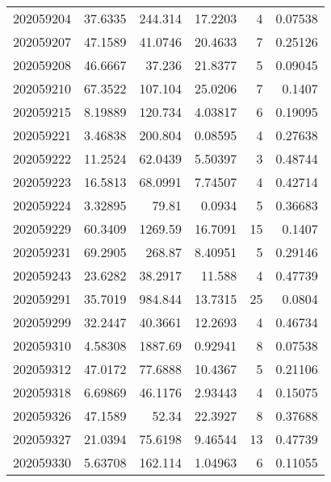 \begin{tabular}{rrrrrr}
 202059204 &         37.6335  &      244.314  &           17.2203  &           4 & 0.07538 \\
 202059207 &         47.1589  &       41.0746 &           20.4633  &           7 & 0.25126 \\
 202059208 &         46.6667  &       37.236  &           21.8377  &           5 & 0.09045 \\
 202059210 &         67.3522  &      107.104  &           25.0206  &           7 & 0.1407  \\
 202059215 &          8.19889 &      120.734  &            4.03817 &           6 & 0.19095 \\
 202059221 &          3.46838 &      200.804  &            0.08595 &           4 & 0.27638 \\
 202059222 &         11.2524  &       62.0439 &            5.50397 &           3 & 0.48744 \\
 202059223 &         16.5813  &       68.0991 &            7.74507 &           4 & 0.42714 \\
 202059224 &          3.32895 &       79.81   &            0.0934  &           5 & 0.36683 \\
 202059229 &         60.3409  &     1269.59   &           16.7091  &          15 & 0.1407  \\
 202059231 &         69.2905  &      268.87   &            8.40951 &           5 & 0.29146 \\
 202059243 &         23.6282  &       38.2917 &           11.588   &           4 & 0.47739 \\
 202059291 &         35.7019  &      984.844  &           13.7315  &          25 & 0.0804  \\
 202059299 &         32.2447  &       40.3661 &           12.2693  &           4 & 0.46734 \\
 202059310 &          4.58308 &     1887.69   &            0.92941 &           8 & 0.07538 \\
 202059312 &         47.0172  &       77.6888 &           10.4367  &           5 & 0.21106 \\
 202059318 &          6.69869 &       46.1176 &            2.93443 &           4 & 0.15075 \\
 202059326 &         47.1589  &       52.34   &           22.3927  &           8 & 0.37688 \\
 202059327 &         21.0394  &       75.6198 &            9.46544 &          13 & 0.47739 \\
 202059330 &          5.63708 &      162.114  &            1.04963 &           6 & 0.11055 \\

\end{tabular}
